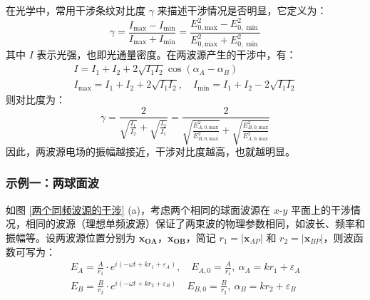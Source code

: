 \documentclass[UTF8]{report}
\theoremstyle{MyLineTheoremStyle} %
\theoremstyle{MyBlockTheoremStyle} %
\theoremstyle{MySubsubsectionStyle} %
\begin{document}
在光学中，常用干涉条纹对比度 $\gamma$ 来描述干涉情况是否明显，它定义为：
\begin{equation}
    \gamma = \frac{I_{\text{max}} - I_{\min}}{I_{\text{max}} + I_{\min}} = \frac{ E_{0,\text{max}}^2 -  E_{0,\min}^2 }{E_{0,\text{max}}^2 +  E_{0,\min}^2}
\end{equation}
其中 $I$ 表示光强，也即光通量密度。在两波源产生的干涉中，有：
\begin{gather}
I = I_1 + I_2 + 2 \sqrt{I_1I_2}\cos (\alpha_A - \alpha_B) \\ 
I_{\text{max}} = I_1 + I_2 + 2\sqrt{I_1I_2},\quad I_{\min} =  I_1 + I_2 - 2\sqrt{I_1I_2}
\end{gather}
则对比度为：
\begin{equation}
\gamma = \frac{2  }{ \sqrt{\frac{I_1}{I_2}}  + \sqrt{\frac{I_2}{I_1}}} = \frac{ 2  }{  \sqrt{\frac{E_{A,0,\text{max}}^2}{E_{B,0,\text{max}}^2}} + \sqrt{\frac{E_{B,0,\text{max}}^2}{E_{A,0,\text{max}}^2}}}
\end{equation}
因此，两波源电场的振幅越接近，干涉对比度越高，也就越明显。

\subsubsection{示例一：两球面波}

如图 \ref{两个同频波源的干涉} (a)，考虑两个相同的球面波源在 $x$-$y$ 平面上的干涉情况，相同的波源（理想单频波源）保证了两束波的物理参数相同，如波长、频率和振幅等。设两波源位置分别为 $\boldsymbol{x_{OA}}$，$\boldsymbol{x_{OB}}$，简记 $ r_1 = | \boldsymbol{x}_{AP} |$ 和 $ r_2 = | \boldsymbol{x}_{BP} |$，则波函数可写为：
\begin{gather}
E_A = \frac{A}{r_1 } \cdot e^{i(-\omega t + k r_1 + \varepsilon_A)},\quad E_{A,0} = \frac{A}{r_1 },\ \alpha_A = k r_1 + \varepsilon_A
\\
E_B = \frac{B}{ r_2 } \cdot e^{i(-\omega t + k r_2  + \varepsilon_B)}\quad E_{B,0} = \frac{B}{ r_2 },\ \alpha_B = k r_2  + \varepsilon_B
\end{gather}
\end{document}
